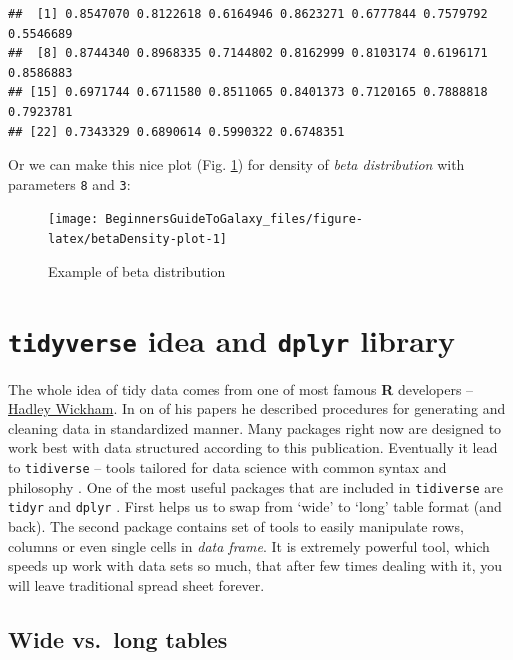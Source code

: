 \documentclass[]{book}
\theoremstyle{definition}
\theoremstyle{definition}
\theoremstyle{definition}
\theoremstyle{remark}
\begin{document}
\begin{verbatim}
##  [1] 0.8547070 0.8122618 0.6164946 0.8623271 0.6777844 0.7579792 0.5546689
##  [8] 0.8744340 0.8968335 0.7144802 0.8162999 0.8103174 0.6196171 0.8586883
## [15] 0.6971744 0.6711580 0.8511065 0.8401373 0.7120165 0.7888818 0.7923781
## [22] 0.7343329 0.6890614 0.5990322 0.6748351
\end{verbatim}

Or we can make this nice plot (Fig. \ref{fig:betaDensity-plot}) for
density of \emph{beta distribution} with parameters \texttt{8} and
\texttt{3}:

\begin{figure}

{\centering \texttt{[image: BeginnersGuideToGalaxy\_files/figure-latex/betaDensity-plot-1]} 

}

\caption{Example of beta distribution}\label{fig:betaDensity-plot}
\end{figure}

\section{\texorpdfstring{\texttt{tidyverse} idea and \texttt{dplyr}
library}{tidyverse idea and dplyr library}}\label{tidyverse-idea-and-dplyr-library}

The whole idea of tidy data comes from one of most famous \textbf{R}
developers -- \href{http://hadley.nz/}{Hadley Wickham}. In on of his
papers \citep{hadley2014} he described procedures for generating and
cleaning data in standardized manner. Many packages right now are
designed to work best with data structured according to this
publication. Eventually it lead to \texttt{tidiverse} -- tools tailored
for data science with common syntax and philosophy \citep{R-tidyverse}.
One of the most useful packages that are included in \texttt{tidiverse}
\citep{R-tidyverse} are \texttt{tidyr} \citep{R-tidyr} and
\texttt{dplyr} \citep{R-dplyr}. First helps us to swap from `wide' to
`long' table format (and back). The second package contains set of tools
to easily manipulate rows, columns or even single cells in \emph{data
frame}. It is extremely powerful tool, which speeds up work with data
sets so much, that after few times dealing with it, you will leave
traditional spread sheet forever.

\subsection{Wide vs.~long tables}\label{wide-vs.long-tables}
\end{document}
